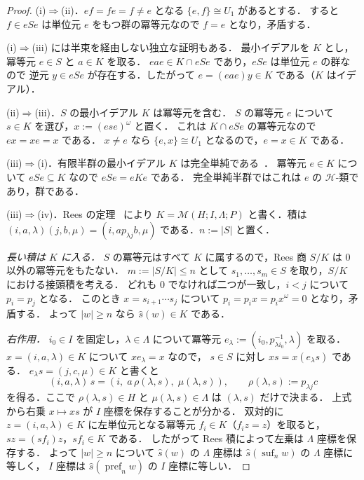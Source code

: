 \begin{proof}
(i)$\Rightarrow$(ii)．$ef=fe=f\ne e$ となる $\{e,f\}\cong U_1$ があるとする．
すると $f\in eSe$ は単位元 $e$ をもつ群の冪等元なので $f=e$ となり，矛盾する．

(i)$\Rightarrow$(iii) には半束を経由しない独立な証明もある．
最小イデアルを $K$ とし，冪等元 $e\in S$ と $a\in K$ を取る．
$eae\in K\cap eSe$ であり，$eSe$ は単位元 $e$ の群なので
逆元 $y\in eSe$ が存在する．したがって
$e=(eae)y\in K$ である（$K$ はイデアル）．

(ii)$\Rightarrow$(iii)．$S$ の最小イデアル $K$ は冪等元を含む．
$S$ の冪等元 $e$ について $s\in K$ を選び，$x:=(ese)^\omega$ と置く．
これは $K\cap eSe$ の冪等元なので $ex=xe=x$ である．
$x\ne e$ なら $\{e,x\}\cong U_1$ となるので，$e=x\in K$ である．

(iii)$\Rightarrow$(i)．有限半群の最小イデアル $K$ は完全単純である~\cite{Howie1995}．
冪等元 $e\in K$ について $eSe\subseteq K$ なので $eSe=eKe$ である．
完全単純半群ではこれは $e$ の $\mathcal H$-類であり，群である．

(iii)$\Rightarrow$(iv)．Rees の定理~\cite{Howie1995} により
$K=\mathcal M(H;I,\Lambda;P)$ と書く．積は
$(i,a,\lambda)(j,b,\mu)=(i,ap_{\lambda j}b,\mu)$ である．$n:=|S|$ と置く．

\emph{長い積は $K$ に入る．}
$S$ の冪等元はすべて $K$ に属するので，Rees 商 $S/K$ は $0$ 以外の冪等元をもたない．
$m:=|S/K|\le n$ として $s_1,\ldots,s_m\in S$ を取り，$S/K$ における接頭積を考える．
どれも $0$ でなければ二つが一致し，$i<j$ について $p_i=p_j$ となる．
このとき $x=s_{i+1}\cdots s_j$ について $p_i=p_ix=p_ix^\omega=0$ となり，矛盾する．
よって $|w|\ge n$ なら $\widehat{s}(w)\in K$ である．

\emph{右作用．}
$i_0\in I$ を固定し，$\lambda\in\Lambda$ について冪等元
$e_\lambda:=(i_0,p_{\lambda i_0}^{-1},\lambda)$ を取る．
$x=(i,a,\lambda)\in K$ について $xe_\lambda=x$ なので，
$s\in S$ に対し $xs=x(e_\lambda s)$ である．
$e_\lambda s=(j,c,\mu)\in K$ と書くと
\[
 (i,a,\lambda)\,s=(i,\;a\,\rho(\lambda,s),\;\mu(\lambda,s)),
 \qquad \rho(\lambda,s):=p_{\lambda j}c
\]
を得る．ここで $\rho(\lambda,s)\in H$ と $\mu(\lambda,s)\in\Lambda$ は $(\lambda,s)$ だけで決まる．
上式から右乗 $x\mapsto xs$ が $I$ 座標を保存することが分かる．
双対的に $z=(i,a,\lambda)\in K$ に左単位元となる冪等元
$f_i\in K$（$f_i z=z$）を取ると，
$sz=(sf_i)z$，$sf_i\in K$ である．
したがって Rees 積によって左乗は $\Lambda$ 座標を保存する．
よって $|w|\ge n$ について $\widehat{s}(w)$ の $\Lambda$ 座標は
$\widehat{s}(\operatorname{suf}_n w)$ の $\Lambda$ 座標に等しく，
$I$ 座標は $\widehat{s}(\operatorname{pref}_n w)$ の $I$ 座標に等しい．


\end{proof}
